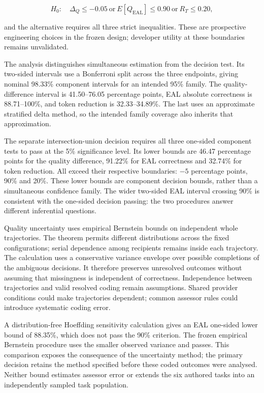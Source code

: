 \documentclass[preprint,11pt]{elsarticle}
\begin{document}
\[
H_0:\quad \Delta_Q\leq-0.05\ \text{or}\ E[Q_{\mathrm{EAL}}]\leq0.90\ \text{or}\ R_T\leq0.20,
\]

and the alternative requires all three strict inequalities. These are
prospective engineering choices in the frozen design; developer utility
at these boundaries remains unvalidated.

The analysis distinguishes simultaneous estimation from the decision
test. Its two-sided intervals use a Bonferroni split across the three
endpoints, giving nominal 98.33\% component intervals for an intended
95\% family. The quality-difference interval is 41.50--76.05 percentage
points, EAL absolute correctness is 88.71--100\%, and token reduction is
32.33--34.89\%. The last uses an approximate stratified delta method, so
the intended family coverage also inherits that approximation.

The separate intersection-union decision requires all three one-sided
component tests to pass at the 5\% significance level. Its lower bounds
are 46.47 percentage points for the quality difference, 91.22\% for EAL
correctness and 32.74\% for token reduction. All exceed their respective
boundaries: \(-5\) percentage points, 90\% and 20\%. These lower bounds
are component decision bounds, rather than a simultaneous confidence
family. The wider two-sided EAL interval crossing 90\% is consistent
with the one-sided decision passing: the two procedures answer different
inferential questions.

Quality uncertainty uses empirical Bernstein bounds on independent whole
trajectories. The theorem permits different distributions across the
fixed configurations; serial dependence among recipients remains inside
each trajectory. The calculation uses a conservative variance envelope
over possible completions of the ambiguous decisions. It therefore
preserves unresolved outcomes without assuming that missingness is
independent of correctness. Independence between trajectories and valid
resolved coding remain assumptions. Shared provider conditions could
make trajectories dependent; common assessor rules could introduce
systematic coding error.

A distribution-free Hoeffding sensitivity calculation gives an EAL
one-sided lower bound of 88.35\%, which does not pass the 90\%
criterion. The frozen empirical Bernstein procedure uses the smaller
observed variance and passes. This comparison exposes the consequence of
the uncertainty method; the primary decision retains the method
specified before these coded outcomes were analysed. Neither bound
estimates assessor error or extends the six authored tasks into an
independently sampled task population.
\end{document}
